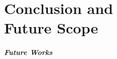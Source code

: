 \chapter[Conclusion and Future Scope]{Conclusion and \\Future Scope}
\lipsum[29-30]

\paragraph{Future Works}
\blinditemize


